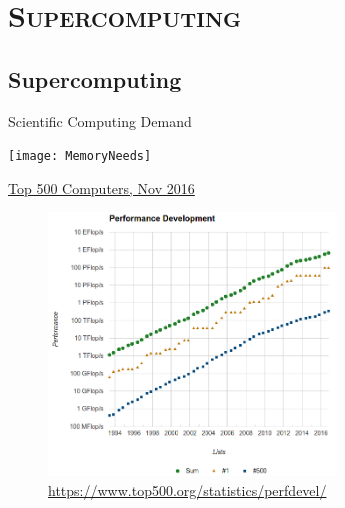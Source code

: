 \documentclass[xcolor=x11names,compress]{beamer}
\renewcommand{\(}{\begin{columns}}
\renewcommand{\)}{\end{columns}}
\newcommand{\<}[1]{\begin{column}{#1}}
\renewcommand{\>}{\end{column}}
\begin{document}
\section{\scshape Supercomputing}
\subsection{Supercomputing}
\begin{frame}{Scientific Computing Demand}

\begin{center}
\texttt{[image: MemoryNeeds]}
\end{center}

\end{frame}

\begin{frame}{\href{https://www.top500.org/statistics/perfdevel/}{Top 500 Computers, Nov 2016}}

\begin{center}
\begin{figure}
\includegraphics[height=2.75in]{../figs/Supercomputers-history-2016}
\caption{\url{https://www.top500.org/statistics/perfdevel/}}
\end{figure}
\end{center}

\end{frame}
\end{document}
